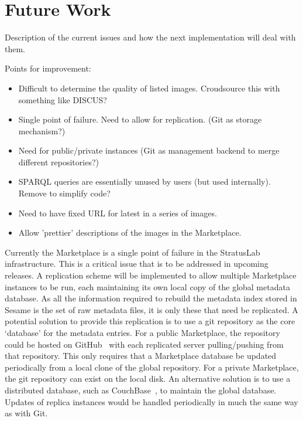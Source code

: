\section{Future Work}

Description of the current issues and how the next implementation will
deal with them. 

Points for improvement:
\begin{itemize}
\item Difficult to determine the quality of listed images.  Croudsource
  this with something like DISCUS?
\item Single point of failure.  Need to allow for replication.  (Git as
  storage mechanism?)
\item Need for public/private instances (Git as management backend to
  merge different repositories?)
\item SPARQL queries are essentially unused by users (but used
  internally).  Remove to simplify code?
\item Need to have fixed URL for latest in a series of images.
\item Allow 'prettier' descriptions of the images in the Marketplace.
\end{itemize}

Currently the Marketplace is a single point of failure in the StratusLab infrastructure. This is 
a critical issue that is to be addressed in upcoming releases. A replication scheme will be 
implemented to allow multiple Marketplace instances to be run, each maintaining its own local
copy of the global metadata database. As all the information required to rebuild the metadata index
stored in Sesame is the set of raw metadata files, it is only these that need be replicated. A potential solution 
to provide this replication is to use a git repository as the core `database' for the metadata entries.  
For a public Marketplace, the repository could be hosted on GitHub~\cite{github} with each replicated server 
pulling/pushing from that repository. This only requires that a Marketplace database be updated periodically 
from a local clone of the global repository.  For a private Marketplace, the git repository can exist on the local disk.
An alternative solution is to use a distributed database, such as CouchBase~\cite{couchbase}, to maintain the
  global database. Updates of replica instances would be handled periodically in much the same way as with Git.